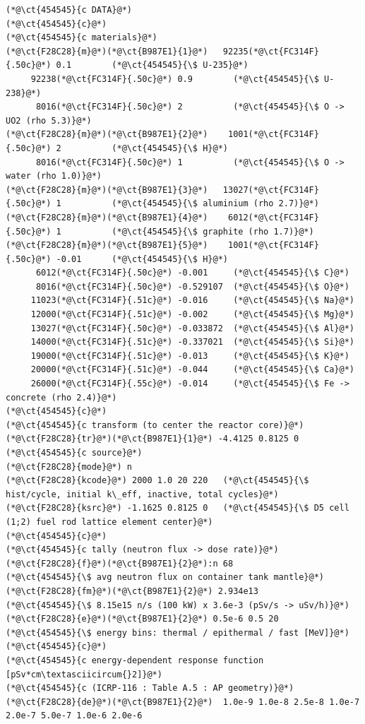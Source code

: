 \begin{lstlisting}[firstnumber=last]
(*@\ct{454545}{c DATA}@*)
(*@\ct{454545}{c}@*)
(*@\ct{454545}{c materials}@*)
(*@\ct{F28C28}{m}@*)(*@\ct{B987E1}{1}@*)   92235(*@\ct{FC314F}{.50c}@*) 0.1        (*@\ct{454545}{\$ U-235}@*)
     92238(*@\ct{FC314F}{.50c}@*) 0.9        (*@\ct{454545}{\$ U-238}@*)
      8016(*@\ct{FC314F}{.50c}@*) 2          (*@\ct{454545}{\$ O -> UO2 (rho 5.3)}@*)
(*@\ct{F28C28}{m}@*)(*@\ct{B987E1}{2}@*)    1001(*@\ct{FC314F}{.50c}@*) 2          (*@\ct{454545}{\$ H}@*)
      8016(*@\ct{FC314F}{.50c}@*) 1          (*@\ct{454545}{\$ O -> water (rho 1.0)}@*)
(*@\ct{F28C28}{m}@*)(*@\ct{B987E1}{3}@*)   13027(*@\ct{FC314F}{.50c}@*) 1          (*@\ct{454545}{\$ aluminium (rho 2.7)}@*)
(*@\ct{F28C28}{m}@*)(*@\ct{B987E1}{4}@*)    6012(*@\ct{FC314F}{.50c}@*) 1          (*@\ct{454545}{\$ graphite (rho 1.7)}@*)
(*@\ct{F28C28}{m}@*)(*@\ct{B987E1}{5}@*)    1001(*@\ct{FC314F}{.50c}@*) -0.01      (*@\ct{454545}{\$ H}@*)
      6012(*@\ct{FC314F}{.50c}@*) -0.001     (*@\ct{454545}{\$ C}@*)
      8016(*@\ct{FC314F}{.50c}@*) -0.529107  (*@\ct{454545}{\$ O}@*)
     11023(*@\ct{FC314F}{.51c}@*) -0.016     (*@\ct{454545}{\$ Na}@*)
     12000(*@\ct{FC314F}{.51c}@*) -0.002     (*@\ct{454545}{\$ Mg}@*)
     13027(*@\ct{FC314F}{.50c}@*) -0.033872  (*@\ct{454545}{\$ Al}@*)
     14000(*@\ct{FC314F}{.51c}@*) -0.337021  (*@\ct{454545}{\$ Si}@*)
     19000(*@\ct{FC314F}{.51c}@*) -0.013     (*@\ct{454545}{\$ K}@*)
     20000(*@\ct{FC314F}{.51c}@*) -0.044     (*@\ct{454545}{\$ Ca}@*)
     26000(*@\ct{FC314F}{.55c}@*) -0.014     (*@\ct{454545}{\$ Fe -> concrete (rho 2.4)}@*)
(*@\ct{454545}{c}@*)
(*@\ct{454545}{c transform (to center the reactor core)}@*)
(*@\ct{F28C28}{tr}@*)(*@\ct{B987E1}{1}@*) -4.4125 0.8125 0
(*@\ct{454545}{c source}@*)
(*@\ct{F28C28}{mode}@*) n
(*@\ct{F28C28}{kcode}@*) 2000 1.0 20 220   (*@\ct{454545}{\$ hist/cycle, initial k\_eff, inactive, total cycles}@*)
(*@\ct{F28C28}{ksrc}@*) -1.1625 0.8125 0   (*@\ct{454545}{\$ D5 cell (1;2) fuel rod lattice element center}@*)
(*@\ct{454545}{c}@*)
(*@\ct{454545}{c tally (neutron flux -> dose rate)}@*)
(*@\ct{F28C28}{f}@*)(*@\ct{B987E1}{2}@*):n 68              (*@\ct{454545}{\$ avg neutron flux on container tank mantle}@*)
(*@\ct{F28C28}{fm}@*)(*@\ct{B987E1}{2}@*) 2.934e13         (*@\ct{454545}{\$ 8.15e15 n/s (100 kW) x 3.6e-3 (pSv/s -> uSv/h)}@*)
(*@\ct{F28C28}{e}@*)(*@\ct{B987E1}{2}@*) 0.5e-6 0.5 20     (*@\ct{454545}{\$ energy bins: thermal / epithermal / fast [MeV]}@*)
(*@\ct{454545}{c}@*)
(*@\ct{454545}{c energy-dependent response function [pSv*cm\textasciicircum{}2]}@*)
(*@\ct{454545}{c (ICRP-116 : Table A.5 : AP geometry)}@*)
(*@\ct{F28C28}{de}@*)(*@\ct{B987E1}{2}@*)  1.0e-9 1.0e-8 2.5e-8 1.0e-7 2.0e-7 5.0e-7 1.0e-6 2.0e-6

\end{lstlisting}
